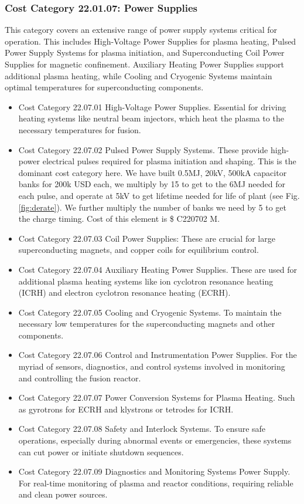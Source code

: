 \subsubsection*{Cost Category 22.01.07: Power Supplies} 

This category covers an extensive range of power supply systems critical for operation. This includes High-Voltage Power Supplies for plasma heating, Pulsed Power Supply Systems for plasma initiation, and Superconducting Coil Power Supplies for magnetic confinement. Auxiliary Heating Power Supplies support additional plasma heating, while Cooling and Cryogenic Systems maintain optimal temperatures for superconducting components. 


\begin{itemize}
    \item Cost Category 22.07.01 High-Voltage Power Supplies. Essential for driving heating systems like neutral beam injectors, which heat the plasma to the necessary temperatures for fusion.
    \item Cost Category 22.07.02 Pulsed Power Supply Systems. These provide high-power electrical pulses required for plasma initiation and shaping.  This is the dominant cost category here.  We have built 0.5MJ, 20kV, 500kA capacitor banks for 200k USD each, we multiply by 15 to get to the 6MJ needed for each pulse, and operate at 5kV to get lifetime needed for life of plant (see Fig. \ref{fig:derate}).  We further multiply the number of banks we need by 5 to get the charge timing.  Cost of this element is \$ C220702 M.


    \item Cost Category 22.07.03 Coil Power Supplies: These are crucial for large superconducting magnets, and copper coils for equilibrium control.
    \item Cost Category 22.07.04 Auxiliary Heating Power Supplies. These are used for additional plasma heating systems like ion cyclotron resonance heating (ICRH) and electron cyclotron resonance heating (ECRH).
    \item Cost Category 22.07.05 Cooling and Cryogenic Systems. To maintain the necessary low temperatures for the superconducting magnets and other components.
    \item Cost Category 22.07.06 Control and Instrumentation Power Supplies. For the myriad of sensors, diagnostics, and control systems involved in monitoring and controlling the fusion reactor.
    \item Cost Category 22.07.07 Power Conversion Systems for Plasma Heating. Such as gyrotrons for ECRH and klystrons or tetrodes for ICRH.
    \item Cost Category 22.07.08 Safety and Interlock Systems. To ensure safe operations, especially during abnormal events or emergencies, these systems can cut power or initiate shutdown sequences.
    \item Cost Category  22.07.09 Diagnostics and Monitoring Systems Power Supply. For real-time monitoring of plasma and reactor conditions, requiring reliable and clean power sources.
\end{itemize}

